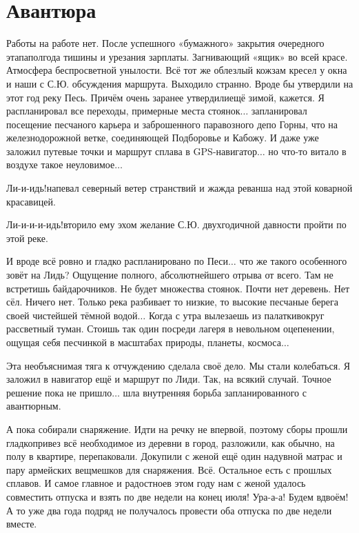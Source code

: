 \chapter{Авантюра} 

Работы на работе нет. После успешного «бумажного» закрытия очередного этапа\mdash полгода тишины и урезания зарплаты. Загнивающий «ящик» во всей красе. Атмосфера беспросветной унылости. Всё тот же облезлый кожзам кресел у окна и наши с С.Ю. обсуждения маршрута. Выходило странно. Вроде бы утвердили на этот год реку Песь. Причём очень заранее утвердили\mdash ещё зимой, кажется. Я распланировал все переходы, примерные места стоянок$\ldots$ запланировал посещение песчаного карьера и заброшенного паравозного депо Горны, что на железнодорожной ветке, соединяющей Подборовье и Кабожу. И даже уже заложил путевые точки и маршрут сплава в GPS-навигатор$\ldots$ но что-то витало в воздухе такое неуловимое$\ldots$
 
\diagdash Ли-и-идь!\mdash напевал северный ветер странствий и жажда реванша над этой коварной красавицей.

\diagdash Ли-и-и-и-идь!\mdash вторило ему эхом желание С.Ю. двухгодичной давности пройти по этой реке. 

И вроде всё ровно и гладко распланировано по Песи$\ldots$ что же такого особенного зовёт на Лидь? Ощущение полного, абсолютнейшего отрыва от всего. Там не встретишь байдарочников. Не будет множества стоянок. Почти нет деревень. Нет сёл. Ничего нет. Только река разбивает то низкие, то высокие песчаные берега своей чистейшей тёмной водой$\ldots$ Когда с утра вылезаешь из палатки\mdash вокруг рассветный туман. Стоишь так один посреди лагеря в невольном оцепенении, ощущая себя песчинкой в масштабах природы, планеты, космоса$\ldots$

Эта необъяснимая тяга к отчуждению сделала своё дело. Мы стали колебаться. Я заложил в навигатор ещё и маршрут по Лиди. Так, на всякий случай. Точное решение пока не пришло$\ldots$ шла внутренняя борьба запланированного с авантюрным.

А пока собирали снаряжение. Идти на речку не впервой, поэтому сборы прошли гладко\mdash привез всё необходимое из деревни в город, разложили, как обычно, на полу в квартире, перепаковали. Докупили с женой ещё один надувной матрас и пару армейских вещмешков для снаряжения. Всё. Остальное есть с прошлых сплавов. И самое главное и радостное\mdash в этом году нам с женой удалось совместить отпуска и взять по две недели на конец июля! Ура-а-а! Будем вдвоём! А то уже два года подряд не получалось провести оба отпуска по две недели вместе.

